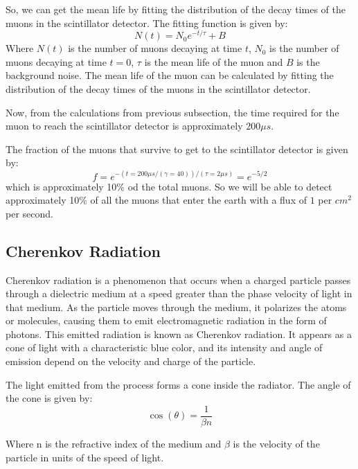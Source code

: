 \documentclass{article}
\begin{document}
\begin{multicols}{2}
So, we can get the mean life by fitting the distribution of the decay times of the muons in the scintillator detector. The fitting function is given by:
\begin{equation}
    N(t) = N_0 e^{-t/\tau} + B
\end{equation}
Where $N(t)$ is the number of muons decaying at time $t$, $N_0$ is the number of muons decaying at time $t=0$, $\tau$ is the mean life of the muon and $B$ is the background noise. The mean life of the muon can be calculated by fitting the distribution of the decay times of the muons in the scintillator detector.


Now, from the calculations from previous subsection, the time required for the muon to reach the scintillator detector is approximately $200 \mu s$. 




The fraction of the muons that survive to get to the scintillator detector is given by:
\begin{equation}
    f = e^{-(t=200 \mu s /(\gamma = 40) )/(\tau = 2 \mu s)} = e^{-5/2}
\end{equation}
which is approximately 10\% od the total muons.
So we will be able to detect approximately 10\% of all the muons that enter the earth with a flux of $1$ per $cm^2$ per second.




\subsection{Cherenkov Radiation}

Cherenkov radiation is a phenomenon that occurs when a charged particle passes through a dielectric medium at a speed greater than the phase velocity of light in that medium. As the particle moves through the medium, it polarizes the atoms or molecules, causing them to emit electromagnetic radiation in the form of photons. This emitted radiation is known as Cherenkov radiation. It appears as a cone of light with a characteristic blue color, and its intensity and angle of emission depend on the velocity and charge of the particle. 


The light emitted from the process forms a cone inside the radiator. The angle of the cone is given by:
\begin{equation}
    \cos(\theta) = \frac{1}{\beta n}
\end{equation}


Where n is the refractive index of the medium and $\beta$ is the velocity of the particle in units of the speed of light.


\end{multicols}
\end{document}
